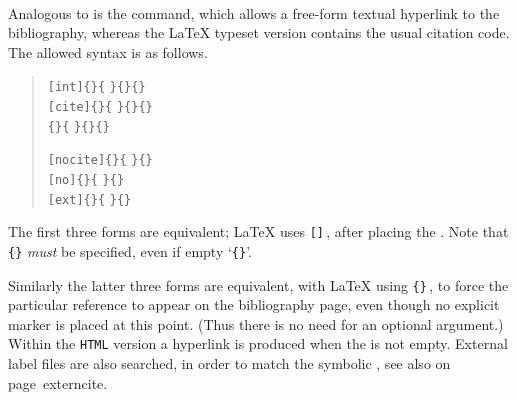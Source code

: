 \paragraph*{\label{hypercite}}
Analogous to  is the  command,
which allows a free-form textual hyperlink to the bibliography,
whereas the \LaTeX{} typeset version contains the usual citation code.
The allowed syntax is as follows.
\begin{small}
\begin{quote}
\verb|[int]{|\verb|}{|%
\verb|}{|\verb|}{|\verb|}|\\
\verb|[cite]{|\verb|}{|%
\verb|}{|\verb|}{|\verb|}|\\
\verb|{|\verb|}{|%
\verb|}{|\verb|}{|\verb|}|\medskip

\verb|[nocite]{|\verb|}{|%
\verb|}{|\verb|}|\\
\verb|[no]{|\verb|}{|%
\verb|}{|\verb|}|\\
\verb|[ext]{|\verb|}{|%
\verb|}{|\verb|}|
\end{quote}
\end{small}
The first three forms are equivalent; 
\LaTeX{} uses \verb|[|\verb|]|\,,
after placing the .
Note that \verb|{|\verb|}| \emph{must} be specified, 
even if empty `\verb|{}|'.

Similarly the latter three forms are equivalent, 
with \LaTeX{} using \verb|{|\verb|}|\,, 
to force the particular reference to appear on the bibliography page, 
even though no explicit marker is placed at this point.
(Thus there is no need for an optional   argument.)\html{\\}
Within the \texttt{HTML} version a hyperlink is produced when the  
is not empty. External label files are also searched, 
in order to match the symbolic , see also 
\hyperref[page]{}{ on page~}{}{externcite}.

